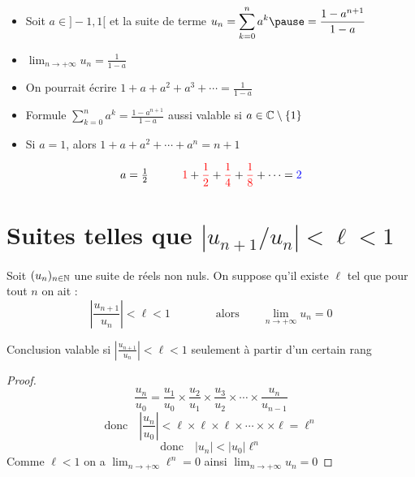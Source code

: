 \begin{frame}
\begin{remarque}
\begin{itemize}  \setlength{\itemsep}{3pt} 
  \item Soit $a\in ]-1,1[$ et la suite de terme $\displaystyle u_n= \sum_{k=0}^na^k
  \pause = \frac{1-a^{n+1}}{1-a}$
\pause\vspace*{-3pt}
  \item $\displaystyle\lim_{n\to +\infty} u_n= \frac{1}{1-a}$
\pause  
  \item On pourrait écrire $\displaystyle1+a+a^2+a^3 +\cdots = \frac{1}{1-a}$
\pause  
  \item Formule $\displaystyle\sum_{k=0}^na^k=\frac{1-a^{n+1}}{1-a} $ aussi valable si $a\in \mathbb{C}\setminus\{1\}$
\pause  
  \item Si $a=1$, alors $1+a+a^2+\cdots+a^n=n+1$
\end{itemize}
\end{remarque}
\pause


\[a=\tfrac{1}{2} \quad \qquad {\color{red}1} + {\color{red}\frac{1}{2}} +
{\color{red}\frac{1}{4}} + {\color{red}\frac{1}{8}} +\cdots = {\color{blue}2} \]  
\vspace*{-2ex}

\end{frame}

\section{Suites telles que $\left|{u_{n+1}}/{u_n}\right|<\ell<1$ }

\begin{frame}
	\begin{theoreme}
Soit  $(u_n)_{n\in \mathbb{N}}$ une suite de réels non nuls. On suppose qu'il existe $\ell$ 
tel que pour tout $n$  on ait :
\[ \left | \frac{u_{n+1}}{u_n}\right |  <\ell<1
\qquad \qquad \text{alors} \qquad \lim_{n\to +\infty} u_n= 0
\]
\end{theoreme}

\pause
\medskip
Conclusion valable si $\left |\frac{u_{n+1}}{u_n}\right |  <\ell<1$ seulement à partir d'un certain rang

\medskip
\pause
\begin{proof}
  \[ \frac{u_n}{u_0}=\frac{u_1}{u_0} \times\frac{u_2}{u_1} \times\frac{u_3}{u_2} 
  \times\cdots\times \frac{u_n}{u_{n-1}}\] 
\pause
  \[\text{donc} \quad \left\lvert\frac{u_n}{u_0}  \right\rvert 
  <\ell\times \ell\times \ell \times \cdots \times \times \ell=\ell^n\] 
\pause
  \[\text{donc} \quad \lvert u_n \rvert <\lvert u_0 \rvert \ell^n \]
\pause
\hfill Comme $\ell<1$ on a $\lim_{n\to +\infty} \ell^n= 0$
ainsi $\lim_{n\to +\infty} u_n= 0$
\end{proof}

\end{frame}


